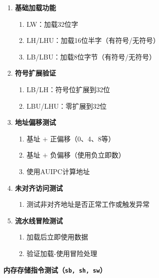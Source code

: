 \documentclass[12pt,a4paper]{ctexart}
\newcommand{\code}[1]{\texttt{#1}}
\begin{document}
\begin{enumerate}
    \item \textbf{基础加载功能}
    \begin{enumerate}
        \item LW：加载32位字
        \item LH/LHU：加载16位半字（有符号/无符号）
        \item LB/LBU：加载8位字节（有符号/无符号）
    \end{enumerate}
    
    \item \textbf{符号扩展验证}
    \begin{enumerate}
        \item LB/LH：符号位扩展到32位
        \item LBU/LHU：零扩展到32位
    \end{enumerate}
    
    \item \textbf{地址偏移测试}
    \begin{enumerate}
        \item 基址 $+$ 正偏移（0、4、8等）
        \item 基址 $+$ 负偏移（使用负立即数）
        \item 使用AUIPC计算地址
    \end{enumerate}
    
    \item \textbf{未对齐访问测试}
    \begin{enumerate}
        \item 测试非对齐地址是否正常工作或触发异常
    \end{enumerate}
    
    \item \textbf{流水线冒险测试}
    \begin{enumerate}
        \item 加载后立即使用数据
        \item 验证加载-使用冒险处理
    \end{enumerate}
\end{enumerate}

\textbf{内存存储指令测试（\code{sb, sh, sw}）}
\end{document}
